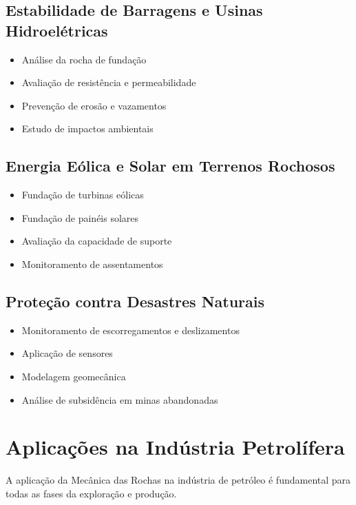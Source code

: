 \documentclass[12pt,a4paper,twoside]{book}
\begin{document}
\subsection{Estabilidade de Barragens e Usinas Hidroelétricas}

\begin{itemize}
    \item Análise da rocha de fundação
    \item Avaliação de resistência e permeabilidade
    \item Prevenção de erosão e vazamentos
    \item Estudo de impactos ambientais
\end{itemize}

\subsection{Energia Eólica e Solar em Terrenos Rochosos}

\begin{itemize}
    \item Fundação de turbinas eólicas
    \item Fundação de painéis solares
    \item Avaliação da capacidade de suporte
    \item Monitoramento de assentamentos
\end{itemize}

\subsection{Proteção contra Desastres Naturais}

\begin{itemize}
    \item Monitoramento de escorregamentos e deslizamentos
    \item Aplicação de sensores
    \item Modelagem geomecânica
    \item Análise de subsidência em minas abandonadas
\end{itemize}

\section{Aplicações na Indústria Petrolífera}

A aplicação da Mecânica das Rochas na indústria de petróleo é fundamental para todas as fases 
da exploração e produção.
\end{document}
